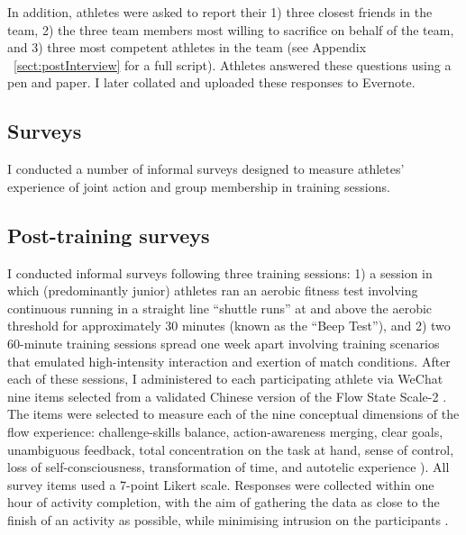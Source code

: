 \begin{CJK}{UTF8}{gbsn}
  In addition, athletes were asked to report their 1) three closest friends in the team, 2) the three team members most willing to sacrifice on behalf of the team, and 3) three most competent athletes in the team (see Appendix ~\ref{sect:postInterview} for a full script). Athletes answered these questions using a pen and paper. I later collated and uploaded these responses to Evernote.








\subsection{Surveys\label{sect:procSurveys}}

 I conducted a number of informal surveys designed to measure athletes' experience of joint action and group membership in training sessions.



  \subsection{Post-training surveys}
    I conducted informal surveys following three training sessions: 1) a session in which (predominantly junior) athletes ran an aerobic fitness test involving continuous running in a straight line ``shuttle runs''  at and above the aerobic threshold for approximately 30 minutes (known as the ``Beep Test''), and 2) two 60-minute training sessions spread one week apart involving training scenarios that emulated high-intensity interaction and exertion of match conditions.  After each of these sessions, I administered to each participating athlete via WeChat nine items selected from a validated Chinese version \citep{Liu2012} of the Flow State Scale-2 \citep{Jackson2002}.  The items were selected to measure each of the nine conceptual dimensions of the flow experience: challenge-skills balance, action-awareness merging, clear goals, unambiguous feedback, total concentration on the task at hand, sense of control, loss of self-consciousness, transformation of time, and autotelic experience \citep{Csikszentmihalyi1990}).  All survey items used a 7-point Likert scale.  Responses were collected within one hour of activity completion, with the aim of gathering the data as close to the finish of an activity as possible, while minimising intrusion on the participants \citep{Jackson2004}.



\end{CJK}
